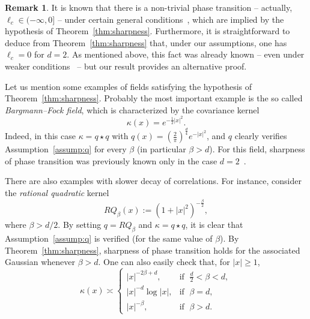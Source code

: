 \documentclass[10pt]{amsart}
\theoremstyle{definition}\newtheorem{defi}[theo]{Definition}\newtheorem{rema}[theo]{Remark}\newtheorem{exam}[theo]{Example}\newtheorem{exem}[theo]{Example}\newtheorem{nota}[theo]{Notation}
\begin{document}
\begin{rema}
It is known that there is a non-trivial phase transition -- actually, $\ell_c\in(-\infty,0]$ -- under certain general conditions~\cite{MoSt83a,MoSt83b}, which are implied by the hypothesis of Theorem~\ref{thm:sharpness}. Furthermore, it is straightforward to deduce from Theorem~\ref{thm:sharpness} that, under our assumptions, one has $\ell_c=0$ for $d=2$. As mentioned above, this fact was already known -- even under weaker conditions~\cite{MRV20} -- but our result provides an alternative proof.
\end{rema}


Let us mention some examples of fields satisfying the hypothesis of Theorem~\ref{thm:sharpness}. Probably the most important example is the so called \emph{Bargmann--Fock field}, which is characterized by the covariance kernel
\[
\kappa(x)=e^{-\frac12 |x|^2}.
\]
Indeed, in this case $\kappa= q\star q$ with $q(x)=(\frac{2}{\pi})^{\frac{d}{4}}e^{-|x|^2}$, and $q$ clearly verifies Assumption~\ref{assump:q} for every $\beta$ (in particular $\beta>d$). For this field, sharpness of phase transition was previously known only in the case $d=2$~\cite{RVb}.

There are also examples with slower decay of correlations. For instance, consider the \emph{rational quadratic} kernel
\[
RQ_{\beta}(x):= \left(1+|x|^2\right)^{-\frac{\beta}{2}},
\]
where $\beta>d/2$. By setting $q=RQ_{\beta}$ and $\kappa=q\star q$, it is clear that Assumption~\ref{assump:q} is verified (for the same value of $\beta$). By Theorem~\ref{thm:sharpness}, sharpness of phase transition holds for the associated Gaussian whenever $\beta>d$. One can also easily check that, for $|x|\geq1$,
\begin{equation}\label{eq:decay_kappa}
\kappa(x)\asymp
\begin{cases}
|x|^{-2\beta+d}, & \text{if }\;\frac{d}{2}<\beta< d,\\
|x|^{-d}\log|x|, & \text{if }\;\beta=d,\\
|x|^{-\beta}, & \text{if }\;\beta>d.
\end{cases}
\end{equation}
\end{document}
